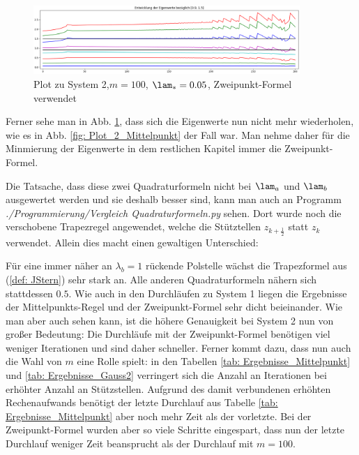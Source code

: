 \documentclass[a4paper,12pt]{report}
\newcommand{\1}{\mathds{1}}
\theoremstyle{plain} %
\theoremstyle{definition} %
\theoremstyle{remark}
\begin{document}
            \begin{figure}[ht]
                  \centering
                  \includegraphics[width=0.9\textwidth, keepaspectratio]{./Verbesserung_Mittelpunkt/Plot_2_100_0.05.png}
                  \caption{Plot zu System 2,$m=100$, $\lam_*=0.05$, Zweipunkt-Formel verwendet}
                  \label{fig: Plot_2_150_0.05_Gauss2}
            \end{figure}

            Ferner sehe man in Abb. \ref{fig: Plot_2_150_0.05_Gauss2}, dass sich die Eigenwerte nun nicht mehr wiederholen, wie es in Abb. \ref{fig: Plot_2_Mittelpunkt} der Fall war.
            Man nehme daher für die Minmierung der Eigenwerte in dem restlichen Kapitel immer die Zweipunkt-Formel.

            Die Tatsache, dass diese zwei Quadraturformeln nicht bei $\lam_a$ und $\lam_b$ ausgewertet werden und sie deshalb besser sind, kann man auch an Programm
            \textit{./Programmierung/Vergleich Quadraturformeln.py} sehen. Dort wurde noch die verschobene Trapezregel angewendet, welche die Stütztellen $z_{k+\frac 1 2}$ statt $z_k$ verwendet.
            Allein dies macht einen gewaltigen Unterschied:

            Für eine immer näher an $\lambda_b = 1$ rückende Polstelle wächst die Trapezformel aus (\ref{def: JStern}) sehr stark an. Alle anderen Quadraturformeln nähern sich stattdessen $0.5$.
            Wie auch in den Durchläufen zu System 1 liegen die Ergebnisse der Mittelpunkts-Regel und der Zweipunkt-Formel sehr dicht beieinander.
            Wie man aber auch sehen kann, ist die höhere Genauigkeit bei System 2 nun von großer Bedeutung:
            Die Durchläufe mit der Zweipunkt-Formel benötigen viel weniger Iterationen und sind daher schneller.
            Ferner kommt dazu, dass nun auch die Wahl von $m$ eine Rolle spielt: in den Tabellen \ref{tab: Ergebnisse_Mittelpunkt} und \ref{tab: Ergebnisse_Gauss2} verringert sich die Anzahl an Iterationen bei erhöhter Anzahl an Stützstellen.
            Aufgrund des damit verbundenen erhöhten Rechenaufwands benötigt der letzte Durchlauf aus Tabelle \ref{tab: Ergebnisse_Mittelpunkt} aber noch mehr Zeit als der vorletzte.
            Bei der Zweipunkt-Formel wurden aber so viele Schritte eingespart, dass nun der letzte Durchlauf weniger Zeit beansprucht als der Durchlauf mit $m=100$.
\end{document}
